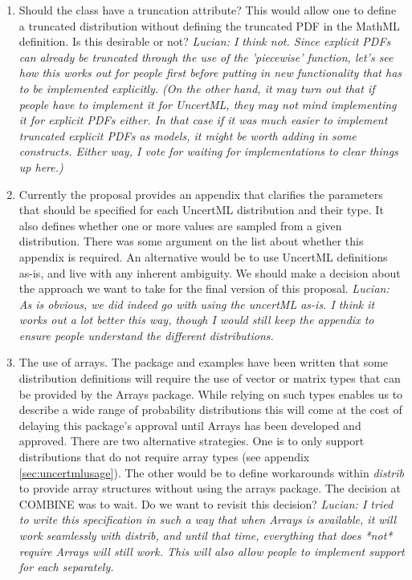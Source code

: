 \documentclass[draftspec]{sbmlpkgspec}
\newcommand{\ExplicitPDF}{\defRef{ExplicitPDF}{explicitPDF-class}}
\newcommand{\distribshort}{\emph{distrib}\xspace}
\newcommand{\mathml}{MathML\xspace}
\newcommand{\uncertml}{UncertML\xspace}
\begin{document}
\begin{enumerate}
\item Should the \ExplicitPDF class have a truncation
  attribute? This would allow one to define a truncated distribution
  without defining the truncated PDF in the \mathml definition. Is
  this desirable or not?
  \emph{Lucian:  I think not.  Since explicit PDFs can already be truncated through the use of the 'piecewise' function, let's see how this works out for people first before putting in new functionality that has to be implemented explicitly.  (On the other hand, it may turn out that if people have to implement it for UncertML, they may not mind implementing it for explicit PDFs either.  In that case if it was much easier to implement truncated explicit PDFs as models, it might be worth adding in some constructs.  Either way, I vote for waiting for implementations to clear things up here.)}

\item Currently the proposal provides an appendix that clarifies the
  parameters that should be specified for each \uncertml distribution and their
  type. It also defines whether one or more values are sampled from a
  given distribution. There was some argument on the list about
  whether this appendix is required. An alternative would be to use
  \uncertml definitions as-is, and live with any inherent
  ambiguity. We should make a decision about the approach we want to
  take for the final version of this proposal.
  \emph{Lucian:  As is obvious, we did indeed go with using the uncertML as-is.  I think it works out a lot better this way, though I would still keep the appendix to ensure people understand the different distributions.}

\item The use of arrays. The package and examples have been written
  that some distribution definitions will require the use of vector or
  matrix types that can be provided by the Arrays package. While
  relying on such types enables us to describe a wide range of
  probability distributions this will come at the cost of delaying
  this package's approval until Arrays has been developed and
  approved. There are two alternative strategies. One is to only
  support distributions that do not require array types (see appendix
  \ref{sec:uncertmlusage}). The other would be to define workarounds
  within \distribshort to provide array structures without using the
  arrays package. The decision at COMBINE was to wait. Do we want to
  revisit this decision?
  \emph{Lucian:  I tried to write this specification in such a way that when Arrays is available, it will work seamlessly with distrib, and until that time, everything that does *not* require Arrays will still work.  This will also allow people to implement support for each separately.}


\end{enumerate}
\end{document}
